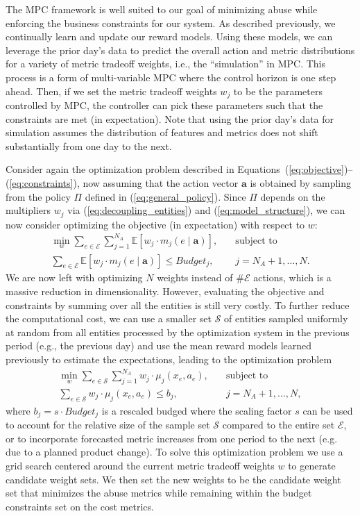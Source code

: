 The MPC framework is well suited to our goal of minimizing abuse while enforcing the business constraints for our system. As described previously, we continually learn and update our reward models. Using these models, we can leverage the prior day's data to predict the overall action and metric distributions for a variety of metric tradeoff weights, i.e., the ``simulation'' in MPC. This process is a form of multi-variable MPC where the control horizon is one step ahead. Then, if we set the metric tradeoff weights $w_j$ to be the parameters controlled by MPC, the controller can pick these parameters such that the constraints are met (in expectation). Note that using the prior day's data for simulation assumes the distribution of features and metrics does not shift substantially from one day to the next.

Consider again the optimization problem described in Equations~(\ref{eq:objective})--(\ref{eq:constraints}), now assuming that the action vector $\mathbf{a}$ is obtained by sampling from the policy $\Pi$ defined in (\ref{eq:general_policy}).  Since $\Pi$ depends on the multipliers $w_j$ via (\ref{eq:decoupling_entities}) and (\ref{eq:model_structure}), we can now consider optimizing the objective (in expectation) with respect to $w$: 
\begin{align*}
\min_w \sum_{e \in \mathcal{E}} \sum_{j=1}^{N_A} \mathbb{E}\left[w_j \cdot m_{j}(e \mid \mathbf{a})\right], & \quad \mbox{subject to} \\
\sum_{e \in \mathcal{E}} \mathbb{E} \left[w_j \cdot m_{j}(e \mid \mathbf{a})\right] \leq Budget_{j}, & \quad j = N_A+1, \ldots, N.
\end{align*}
We are now left with optimizing $N$ weights instead of $\#\mathcal{E}$ actions, which is a massive reduction in dimensionality. However, evaluating  the objective and constraints by summing over all the entities is still very costly. To further reduce the computational cost, we can use a smaller set $\mathcal{S}$ of entities sampled uniformly at random from all entities processed by the optimization system in the previous period (e.g., the previous day) and use the mean reward models learned previously to estimate the expectations, leading to the optimization problem
\begin{align}
\label{eq:mpc_objective}
\min_w \sum_{e \in \mathcal{S}} \sum_{j=1}^{N_A} w_j \cdot \mu_{j}(x_e, a_e), & \quad \mbox{subject to} \\
\sum_{e \in \mathcal{S}} w_j \cdot \mu_{j}(x_e,a_e) \leq b_j, & \quad j = N_A+1, \ldots, N,
\end{align}
where $b_j = s  \cdot Budget_j$ is a rescaled budged where the scaling factor $s$ can be used to account for the relative size of the sample set $\mathcal{S}$ compared to the entire set $\mathcal{E}$, or to incorporate forecasted metric increases from one period to the next (e.g. due to a planned product change). To solve this optimization problem we use a grid search centered around the current metric tradeoff weights $w$ to generate candidate weight sets. We then set the new weights to be the candidate weight set that minimizes the abuse metrics while remaining within the budget constraints set on the cost metrics. 
